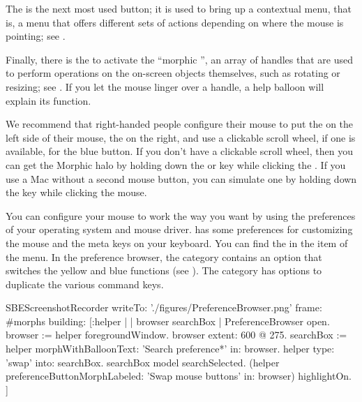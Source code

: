 \documentclass[a4paper,10pt,twoside]{book}
\begin{document}
The  is the next most used button; it is used to bring up a contextual menu, that is, a menu that offers different sets of actions depending on where the mouse is pointing; see .

\dothis{Type \ct{Time now} in the workspace.
Now click the yellow button in the workspace.
Select \emph{print it}.%
}

Finally, there is the  to activate the ``morphic '', an array of handles that are used to perform operations on the on-screen objects themselves, such as rotating or resizing; see .
If you let the mouse linger over a handle, a help balloon will explain its function.


We recommend that right-handed people configure their mouse to put the  on the left side of their mouse, the  on the right, and use a clickable scroll wheel, if one is available, for the blue button.
If you don't have a clickable scroll wheel, then you can get the Morphic halo by holding down the  or  key while clicking the .
If you use a Mac without a second mouse button, you can simulate one by holding down the \clover{} key while clicking the mouse.

You can configure your mouse to work the way you want by using the preferences of your operating system and mouse driver.
\sq has some preferences for customizing the mouse and the meta keys on your keyboard.
You can find the  in the  item of the  menu.
In the preference browser, the  category contains an option  that switches the yellow and blue functions (see ).
The  category has options to duplicate the various command keys.


\begin{ExecuteSmalltalkScript}
SBEScreenshotRecorder writeTo: './figures/PreferenceBrowser.png' frame: #morphs building: [:helper |
	| browser searchBox |
	PreferenceBrowser open.
	browser := helper foregroundWindow.
	browser extent: 600 @ 275.
	searchBox := helper morphWithBalloonText: 'Search preference*' in: browser.
	helper type: 'swap' into: searchBox.
	searchBox model searchSelected.
	(helper preferenceButtonMorphLabeled: 'Swap mouse buttons' in: browser) highlightOn.
]
\end{ExecuteSmalltalkScript}
\end{document}
